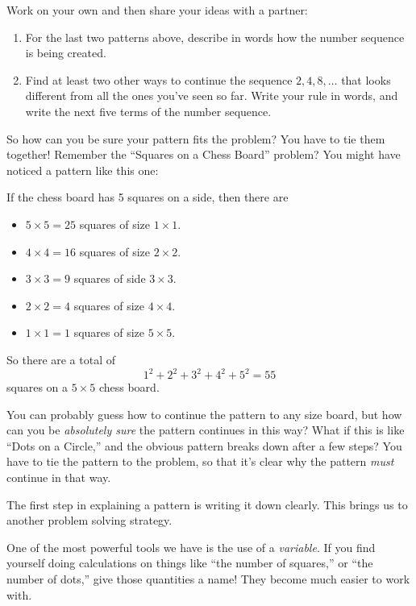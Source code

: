 \begin{thinkpair*}
Work on your own and then share your ideas with a partner:
\begin{enumerate}
\item
For the last two patterns above, describe in words how the number sequence is being created.  
\item
Find at least two other ways to continue the sequence $2, 4, 8, \dots$ that looks different from all the ones you've seen so far.  Write your rule in words, and write the next five terms of the number sequence.
\end{enumerate}
\end{thinkpair*}

So how can you be sure your pattern fits the problem?  You have to tie them together!  Remember the ``Squares on a Chess Board'' problem?  You might have noticed a pattern like this one:

If the chess board has 5 squares on a side, then there are
\begin{itemize}
\item
$5 \times 5 =25$ squares of size $1 \times 1$.
\item
$4 \times 4 = 16$ squares of size $2 \times 2$.
\item
$3 \times 3 =9$ squares of side $3 \times 3$.
\item 
$2 \times 2 = 4$ squares of size $4 \times 4$.
\item
$1 \times 1 = 1$ squares of size $5 \times 5$.
\end{itemize}
So there are a total of
\[
1^2 + 2^2 + 3^2 + 4^2 + 5^2 = 55
\]
squares on a $5 \times 5$ chess board.

You can probably guess how to continue the pattern to any size board, but  how can you be \emph{absolutely sure} the pattern continues in this way?  What if this is like ``Dots on a Circle,'' and the obvious pattern breaks down after a few steps? You have to tie the pattern to the problem, so that it's clear why the pattern \emph{must} continue in that way.

The first step in explaining a pattern is writing it down clearly.  This brings us to another problem solving strategy.

\begin{ps}
One of the most powerful tools we have   is the use of a \emph{variable}.  If you find yourself doing calculations on things like ``the number of squares,'' or ``the number of dots,'' give those quantities a name!  They become much easier to work with.
\end{ps}

